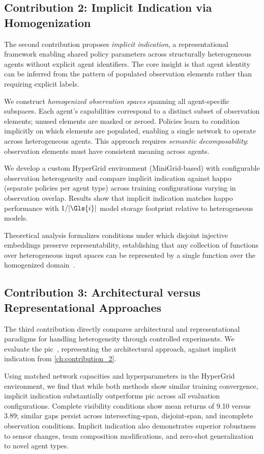 \subsection{Contribution 2: Implicit Indication via Homogenization}

The second contribution proposes \emph{implicit indication}, 
a representational framework enabling shared policy parameters 
across structurally heterogeneous agents without explicit 
agent identifiers. The core insight is that agent identity 
can be inferred from the pattern of populated observation 
elements rather than requiring explicit labels.

We construct \emph{homogenized observation spaces} spanning 
all agent-specific subspaces. Each agent's capabilities 
correspond to a distinct subset of observation elements; 
unused elements are masked or zeroed. Policies learn to 
condition implicitly on which elements are populated, 
enabling a single network to operate across heterogeneous agents. 
This approach requires \emph{semantic decomposability}: 
observation elements must have consistent meaning across agents.

We develop a custom HyperGrid environment (MiniGrid-based) 
with configurable observation heterogeneity and compare 
implicit indication against \gls{happo} (separate policies per agent type) 
across training configurations varying in observation overlap. 
Results show that implicit indication matches \gls{happo} 
performance with \(1/|\Gls{i}|\) model storage footprint relative to
heterogeneous models. 

Theoretical analysis formalizes conditions under which 
disjoint injective embeddings preserve representability, 
establishing that any collection of functions over heterogeneous 
input spaces can be represented by a single function over the 
homogenized domain~\cite{zaheer2017}.

\subsection{Contribution 3: Architectural versus Representational Approaches}

The third contribution directly compares architectural 
and representational paradigms for handling heterogeneity 
through controlled experiments. We evaluate the \gls{pic}~\cite{liu2020b}, 
representing the architectural approach, against implicit indication 
from \cref{ch:contribution_2}.

Using matched network capacities and hyperparameters in the 
HyperGrid environment, we find that while both methods show 
similar training convergence, implicit indication substantially 
outperforms \gls{pic} across all evaluation configurations. 
Complete visibility conditions show mean returns of 9.10 versus 3.89; 
similar gaps persist across intersecting-span, disjoint-span, and 
incomplete observation conditions. Implicit indication also 
demonstrates superior robustness to sensor changes, 
team composition modifications, and zero-shot generalization to novel agent types.

